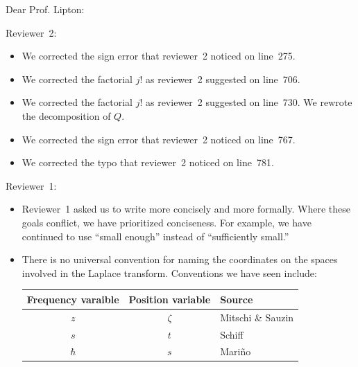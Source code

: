 \documentclass{letter}
\date{March \textcolor{violet}{--}, 2023}
\begin{document}
\begin{letter}{}
\opening{Dear Prof. Lipton:}

\color{violet}
Reviewer~2:
\begin{itemize}
    \item We corrected the sign error that reviewer~2 noticed on line~275.
    \item We corrected the factorial $j!$ as reviewer~2 suggested on line~706.
     \item We corrected the factorial $j!$ as reviewer~2 suggested on line~730. We rewrote the decomposition of $Q$. 
     \item We corrected the sign error that reviewer~2 noticed on line~767.
      \item We corrected the typo that reviewer~2 noticed on line~781.
\end{itemize}
Reviewer~1:
\begin{itemize}
\item Reviewer~1 asked us to write more concisely and more formally. Where these goals conflict, we have prioritized conciseness. For example, we have continued to use ``small enough'' instead of ``sufficiently small.''
\item There is no universal convention for naming the coordinates on the spaces involved in the Laplace transform. Conventions we have seen include:
\begin{center}
\begin{tabular}{c|c|l}
Frequency varaible & Position variable & Source \\ \hline
$z$ & $\zeta$ & Mitschi \& Sauzin \\
$s$ & $t$ & Schiff \\
$\hbar$ & $s$ & Mari\~{n}o \\
\end{tabular}
\end{center}

\end{itemize}
\end{letter}
\end{document}
